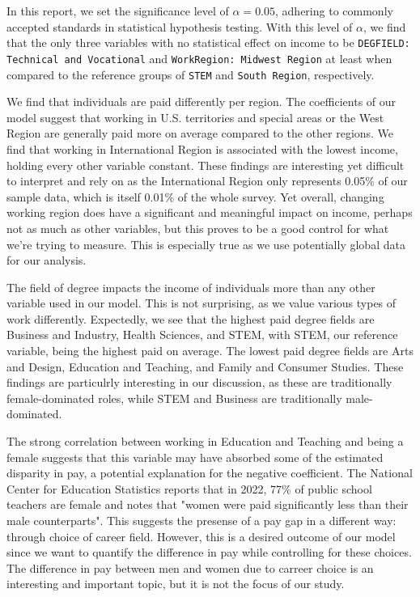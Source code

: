 \documentclass{article}
\begin{document}
In this report, we set the significance level of $\alpha = 0.05$, adhering to commonly accepted standards in statistical hypothesis testing. With this
level of $\alpha$, we find that the only three variables with no statistical effect on income to be \texttt{DEGFIELD: Technical and Vocational} and \texttt{WorkRegion: Midwest Region} at least when compared to the reference groups of \texttt{STEM} and \texttt{South Region}, respectively.

We find that individuals are paid differently per region. The coefficients of our model suggest that working in U.S. territories and special areas or the West Region are generally paid more on average compared to the other regions.
We find that working in International Region is associated with the lowest income, holding every other variable constant. These findings are interesting yet difficult to interpret and rely on as the International Region only represents 0.05\% of our sample data, which is itself 0.01\% of the whole survey.
Yet overall, changing working region does have a significant and meaningful impact on income, perhaps not as much as other variables, but this proves to be a good control for what we're trying to measure. This is especially true
as we use potentially global data for our analysis.

The field of degree impacts the income of individuals more than any other variable used in our model. This is not surprising, as we value various types of work differently.
Expectedly, we see that the highest paid degree fields are Business and Industry, Health Sciences, and STEM, with STEM, our reference variable, being the highest paid on average.
The lowest paid degree fields are Arts and Design, Education and Teaching, and Family and Consumer Studies. These findings are particulrly interesting in our discussion, as these are traditionally
female-dominated roles, while STEM and Business are traditionally male-dominated.

The strong correlation between working in Education and Teaching and being a female suggests that this variable may have absorbed some of the estimated disparity in pay, a potential explanation for the negative coefficient.
The National Center for Education Statistics reports that in 2022, 77\% of public school teachers are female and notes that "women were paid significantly less than their male counterparts"\cite{public-school}.
This suggests the presense of a pay gap in a different way: through choice of career field. However, this is a desired outcome of our model since we want to quantify the difference in pay while controlling for these choices.
The difference in pay between men and women due to carreer choice is an interesting and important topic, but it is not the focus of our study.
\end{document}
